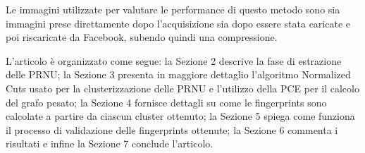 Le immagini utilizzate per valutare le performance di questo metodo sono sia immagini prese direttamente dopo l'acquisizione sia dopo essere stata caricate e poi riscaricate da Facebook, subendo quindi una compressione.

L'articolo è organizzato come segue: la Sezione 2 descrive la fase di estrazione delle PRNU; la Sezione 3 presenta in maggiore dettaglio l'algoritmo Normalized Cuts usato per la clusterizzazione delle PRNU e l'utilizzo della PCE per il calcolo del grafo pesato; la Sezione 4 fornisce dettagli su come le fingerprints sono calcolate a partire da ciascun cluster ottenuto; la Sezione 5 spiega come funziona il processo di validazione delle fingerprints ottenute; la Sezione 6 commenta i risultati e infine la Sezione 7 conclude l'articolo.